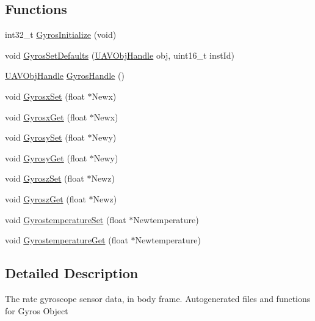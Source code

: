 \subsection*{\-Functions}
\begin{DoxyCompactItemize}
\item 
int32\-\_\-t \hyperlink{group___gyros_ga73097c18a86508f0275f5aabc1bd4df1}{\-Gyros\-Initialize} (void)
\item 
void \hyperlink{group___gyros_gad02acccc19a79ee4f0516c72c0fd6518}{\-Gyros\-Set\-Defaults} (\hyperlink{targets_2_u_a_v_objects_2inc_2uavobjectmanager_8h_a279053e22be53ce9f895043aaeb91e3b}{\-U\-A\-V\-Obj\-Handle} obj, uint16\-\_\-t inst\-Id)
\item 
\hyperlink{targets_2_u_a_v_objects_2inc_2uavobjectmanager_8h_a279053e22be53ce9f895043aaeb91e3b}{\-U\-A\-V\-Obj\-Handle} \hyperlink{group___gyros_gac4380676bcd12d515427a9e55046b559}{\-Gyros\-Handle} ()
\item 
void \hyperlink{group___gyros_gace79333132b4e12e0d30110b464923cf}{\-Gyrosx\-Set} (float $\ast$\-Newx)
\item 
void \hyperlink{group___gyros_gaecbad3866ec61d3ebb2bb3e3ef5e5e05}{\-Gyrosx\-Get} (float $\ast$\-Newx)
\item 
void \hyperlink{group___gyros_gaa4722205072523025095f79326b7fb02}{\-Gyrosy\-Set} (float $\ast$\-Newy)
\item 
void \hyperlink{group___gyros_ga3de99404004795becf608036a45b87d5}{\-Gyrosy\-Get} (float $\ast$\-Newy)
\item 
void \hyperlink{group___gyros_ga98a0021e730bbf8b35ea59d09e0be32c}{\-Gyrosz\-Set} (float $\ast$\-Newz)
\item 
void \hyperlink{group___gyros_ga4b1da7a5f021b70136992b01847483f2}{\-Gyrosz\-Get} (float $\ast$\-Newz)
\item 
void \hyperlink{group___gyros_gac70ab738e7592bb332e1373e483e00c7}{\-Gyrostemperature\-Set} (float $\ast$\-Newtemperature)
\item 
void \hyperlink{group___gyros_ga4a246e00cda6aa9052d467af1c508c6b}{\-Gyrostemperature\-Get} (float $\ast$\-Newtemperature)
\end{DoxyCompactItemize}


\subsection{\-Detailed \-Description}
\-The rate gyroscope sensor data, in body frame. \-Autogenerated files and functions for \-Gyros \-Object 


